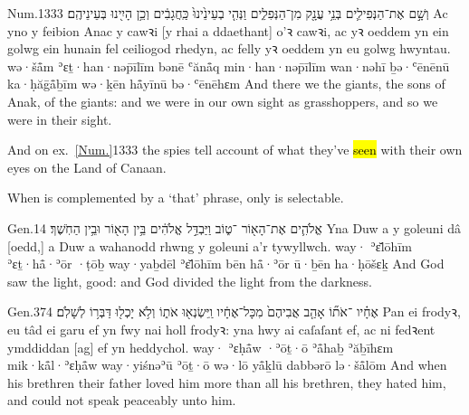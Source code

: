 \begin{example}{Num.}{13}{33}{}{}
	\quoling
	{וְשָׁ֣ם  אֶת־הַנְּפִילִ֛ים בְּנֵ֥י עֲנָ֖ק מִן־הַנְּפִלִ֑ים וַנְּהִ֤י בְעֵינֵ֙ינוּ֙ כַּֽחֲגָבִ֔ים וְכֵ֥ן הָיִ֖ינוּ בְּעֵינֵיהֶֽם׃}
	{Ac yno y  feibion Anac y cawꝛi [y rhai a ddaethant] o’ꝛ cawꝛi, ac yꝛ oeddem yn ein golwg ein hunain fel ceiliogod rhedyn, ac felly yꝛ oeddem yn eu golwg hwyntau.}
	{wə·šå̄m  ʾɛṯ·han·nəp̄īlīm bənē ʿănå̄q min·han·nəp̄īlīm wan·nəhī ḇə·ʿēnēnū ka·ḥăḡå̄ḇīm wə·ḵēn hå̄yīnū bə·ʿēnēhɛm}
	{And there we  the giants, the sons of Anak,  of the giants: and we were in our own sight as grasshoppers, and so we were in their sight.}
\end{example}
\begin{paper}
	\explain And on ex.~\vref{Num.}{13}{33}{} the spies tell account of what they’ve \hl{seen} with their own eyes on the Land of Canaan.
\end{paper}




\begin{paper}
	{\click} When  is complemented by a  ‘that’ phrase, only  is selectable.
\end{paper}

\begin{example}{Gen.}{1}{4}{}{}
	\quoling
	{ אֱלֹהִ֛ים אֶת־הָא֖וֹר ־ט֑וֹב וַיַּבְדֵּ֣ל אֱלֹהִ֔ים בֵּ֥ין הָא֖וֹר וּבֵ֥ין הַחֹֽשֶׁךְ׃}
	{Yna Duw a  y goleuni  dâ [oedd,] a Duw a wahanodd rhwng y goleuni a’r tywyllwch.}
	{way· ʾɛ̆lōhīm ʾɛṯ·hå̄·ʾōr ·ṭōḇ way·yaḇdēl ʾɛ̆lōhīm bēn hå̄·ʾōr ū·ḇēn ha·ḥōšɛḵ}
	{And God saw the light,   good: and God divided the light from the darkness.}
\end{example}

\begin{example}{Gen.}{37}{4}{}{}
	\quoling
	{ אֶחָ֗יו ־אֹת֞וֹ אָהַ֤ב אֲבִיהֶם֙ מִכָּל־אֶחָ֔יו וַֽיִּשְׂנְא֖וּ אֹת֑וֹ וְלֹ֥א יָכְל֖וּ דַּבְּר֥וֹ לְשָׁלֹֽם׃}
	{Pan  ei frodyꝛ,  eu tâd  ei garu ef yn fwy nai holl frodyꝛ: yna hwy ai caſaſant ef, ac ni fedꝛent ymddiddan [ag] ef yn heddychol.}
	{way· ʾɛḥå̄w ·ʾōṯ·ō ʾå̄haḇ ʾăḇīhɛm mik·kå̄l·ʾɛḥå̄w way·yiśnəʾū ʾōṯ·ō wə·lō yå̄ḵlū dabbərō lə·šå̄lōm}
	{And when his brethren   their father loved him more than all his brethren, they hated him, and could not speak peaceably unto him.}
\end{example}

